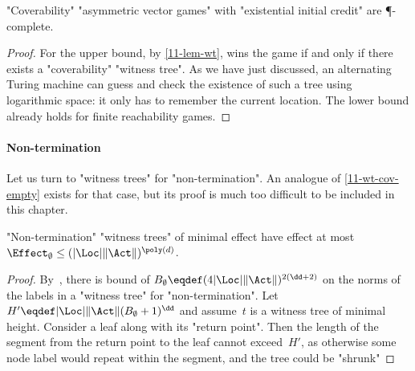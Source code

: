 \begin{theorem}\label{11-cov-exist-P}
  "Coverability" "asymmetric vector games" with "existential initial
  credit" are \P-complete.
\end{theorem}
\begin{proof}
  For the upper bound, by \cref{11-lem-wt}, \Eve wins the game if and
  only if there exists a "coverability" "witness tree".  As we have
  just discussed, an alternating Turing machine can guess and check
  the existence of such a tree using logarithmic space: it only has to
  remember the current location.  The lower bound already holds for
  finite reachability games.
\end{proof}

\paragraph{Non-termination}
Let us turn to "witness trees" for "non-termination".  An analogue
of \cref{11-wt-cov-empty} exists for that case, but its proof is much
too difficult to be included in this chapter.
\begin{claim}
  "Non-termination" "witness trees" of minimal effect have effect at most
  $\Effect_\emptyset\leq(|\Loc|\|\Act\|)^{\poly(d)}$.
\end{claim}
\begin{proof}
  By~\cite{Jurdzinski&Lazic&Schmitz:2015}, there is bound of
  $B_\emptyset\eqdef(4|\Loc|\|\Act\|)^{2(\dd+2)}$ on the norms of the
  labels in a "witness tree" for "non-termination".  Let $H'\eqdef
  |\Loc|\|\Act\| (B_\emptyset+1)^{\dd}$ and assume~$t$ is a witness
  tree of minimal height.  Consider a leaf along with its "return
  point".  Then the length of the segment from the return point to the
  leaf cannot exceed~$H'$, as otherwise some node label would repeat
  within the segment, and the tree could be "shrunk"
\end{proof}
